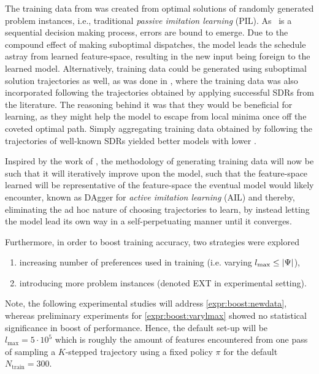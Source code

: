 \documentclass[twocolumn]{svjour3}
\begin{document}
The training data from \cite{InRu11a} was created from optimal solutions of 
randomly generated problem instances, i.e., traditional \emph{passive
imitation learning} (PIL). 
As \JSP\ is a sequential decision making process, errors are bound to emerge. 
Due to the compound effect of making suboptimal dispatches, the model leads the 
schedule astray from learned feature-space, resulting in the new input being 
foreign to the learned model. 
Alternatively, training data could be generated using suboptimal solution 
trajectories as well, as was done in \cite{InRu15a}, where the training data 
was also incorporated following the trajectories obtained by applying 
successful SDRs from the literature. 
The reasoning behind it was that they would be beneficial for learning, 
as they might help the model to escape from local minima once off the coveted 
optimal path. 
Simply aggregating training data obtained by following the trajectories of 
well-known SDRs yielded better models with lower \namerho. 

Inspired by the work of \cite{RossB10,RossGB11}, the methodology of generating 
training data will now be such that it will iteratively improve upon the model, 
such that the feature-space learned will be representative of the feature-space 
the eventual model would likely encounter, known as DAgger for \emph{active 
imitation learning} (AIL) and thereby, eliminating the ad hoc nature of 
choosing trajectories to learn, by instead letting the model lead its own way 
in a self-perpetuating manner until it converges.

Furthermore, in order to boost training accuracy, two strategies were explored 
\begin{enumerate}[after={{}}, leftmargin=*,
label={\textbf{Boost.\arabic*}}, ref={{Boost.\arabic*}}]
\item \label{expr:boost:varylmax} increasing number of preferences used 
in training (i.e. varying \mbox{$l_{\max} \leq \lvert\Psi\rvert$}),
\item \label{expr:boost:newdata} introducing more problem instances (denoted 
EXT in experimental setting).
\end{enumerate}
Note, the following experimental studies will address 
\ref{expr:boost:newdata}, whereas preliminary experiments for 
\ref{expr:boost:varylmax} showed no statistical significance in boost of 
performance. Hence, the default set-up will be $l_{\max}=5 \cdot 10^5$ which is 
roughly the amount of features encountered from one pass of sampling a 
\mbox{$K$-stepped} trajectory using a fixed policy $\pi$ for the default 
$N_{\text{train}}=300$. 
\end{document}
